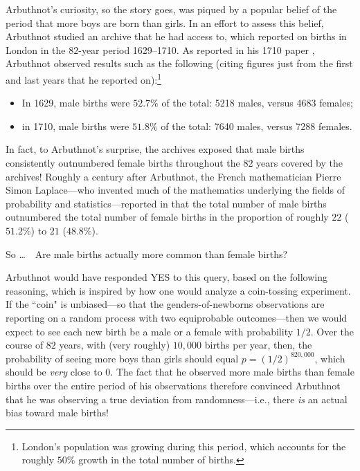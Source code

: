Arbuthnot's curiosity, so the story goes, was piqued by a popular belief of the period that more boys are born than girls.  In an effort to assess this belief, Arbuthnot studied an archive that he had access to, which reported on births in London in the $82$-year period 1629--1710.  As reported in his 1710 paper \cite{Arbuthnot}, Arbuthnot observed results such as the following (citing figures just from the first and last years that he reported on):\footnote{London's population was growing during this period, which accounts for the roughly $50\%$ growth in the total number of births.}
\begin{itemize}
\item
In 1629, male births were $52.7\%$ of the total: 5218 males, versus 4683 females;
\item
in 1710, male births were $51.8\%$ of the total: 7640 males, versus 7288 females.
\end{itemize}
In fact, to Arbuthnot's surprise, the archives exposed that male births consistently outnumbered female births throughout the $82$ years covered by the archives!  Roughly a century after Arbuthnot, the French mathematician Pierre Simon Laplace---who invented much of the mathematics underlying the fields of probability and statistics---reported in \cite{Laplace} that the total number of male births outnumbered the total number of female births in the proportion of roughly $22$ ($51.2\%$) to $21$ ($48.8\%$).

\medskip

\noindent
So \ldots \ \ Are male births actually more common than female births?

\medskip

\noindent
Arbuthnot would have responded YES to this query, based on the following reasoning, which is inspired by how one would analyze a coin-tossing experiment.  If the ``coin" is unbiased---so that the genders-of-newborns observations are reporting on a random process with two equiprobable outcomes---then we would expect to see each new birth be a male or a female with probability $1/2$.  Over the course of $82$ years, with (very roughly) $10,000$ births per year, then, the probability of seeing more boys than girls should equal $p=(1/2)^{820,000}$, which should be {\em very} close to $0$.  The fact that he observed more male births than female births over the entire period of his observations therefore convinced Arbuthnot that he was observing a true deviation from randomness---i.e., there {\em is} an actual bias toward male births!

